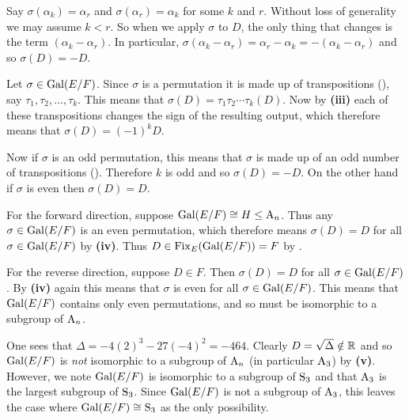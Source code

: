 \begin{questions}
\begin{partquestions}{\roman*}
        \item Say $\sigma(\alpha_k) = \alpha_r$ and $\sigma(\alpha_r) = \alpha_k$ for some $k$ and $r$. Without loss of generality we may assume $k < r$. So when we apply $\sigma$ to $D$, the only thing that changes is the term $(\alpha_k - \alpha_r)$. In particular, $\sigma(\alpha_k - \alpha_r) = \alpha_r - \alpha_k = -(\alpha_k - \alpha_r)$ and so $\sigma(D) = -D$.
        
        \item Let $\sigma \in \mathrm{Gal}(E/F)$. Since $\sigma$ is a permutation it is made up of transpositions (), say $\tau_1, \tau_2, \dots, \tau_k$. This means that $\sigma(D) = \tau_1\tau_2\cdots\tau_k(D)$. Now by \textbf{(iii)} each of these transpositions changes the sign of the resulting output, which therefore means that $\sigma(D) = (-1)^kD$.
        
        Now if $\sigma$ is an odd permutation, this means that $\sigma$ is made up of an odd number of transpositions (). Therefore $k$ is odd and so $\sigma(D) = -D$. On the other hand if $\sigma$ is even then $\sigma(D) = D$.
        
        \item For the forward direction, suppose $\mathrm{Gal}(E/F) \cong H \leq \mathrm{A}_{n}$. Thus any $\sigma \in \mathrm{Gal}(E/F)$ is an even permutation, which therefore means $\sigma(D) = D$ for all $\sigma \in \mathrm{Gal}(E/F)$ by \textbf{(iv)}. Thus $D \in \mathrm{Fix}_{E}(\mathrm{Gal}(E/F)) = F$ by .
        
        For the reverse direction, suppose $D \in F$. Then $\sigma(D) = D$ for all $\sigma \in \mathrm{Gal}(E/F)$. By \textbf{(iv)} again this means that $\sigma$ is even for all $\sigma \in \mathrm{Gal}(E/F)$. This means that $\mathrm{Gal}(E/F)$ contains only even permutations, and so must be isomorphic to a subgroup of $\mathrm{A}_{n}$.
        
        \item One sees that $\Delta = -4(2)^3 - 27(-4)^2 = -464$. Clearly $D = \sqrt{\Delta} \notin \mathbb{R}$ and so $\mathrm{Gal}(E/F)$ is \textit{not} isomorphic to a subgroup of $\mathrm{A}_{n}$ (in particular $\mathrm{A}_{3}$) by \textbf{(v)}. However, we note $\mathrm{Gal}(E/F)$ is isomorphic to a subgroup of $\mathrm{S}_{3}$ and that $\mathrm{A}_{3}$ is the largest subgroup of $\mathrm{S}_{3}$. Since $\mathrm{Gal}(E/F)$ is not a subgroup of $\mathrm{A}_{3}$, this leaves the case where $\mathrm{Gal}(E/F) \cong \mathrm{S}_{3}$ as the only possibility.
    \end{partquestions}
\end{questions}
